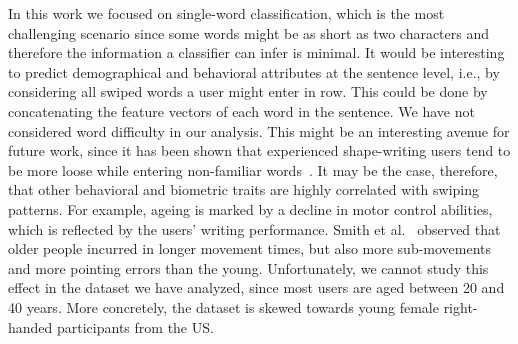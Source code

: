 \documentclass[11pt,oneside,a4paper,openright]{book}
\begin{document}




In this work we focused on single-word classification,
which is the most challenging scenario since some words might be as short as two characters
and therefore the information a classifier can infer is minimal.
It would be interesting to predict demographical and behavioral attributes
at the sentence level, i.e., by considering all swiped words a user might enter in row.
This could be done by concatenating the feature vectors of each word in the sentence.
We have not considered word difficulty in our analysis.
This might be an interesting avenue for future work,
since it has been shown that experienced shape-writing users
tend to be more loose while entering non-familiar words~\cite{Leiva21_swipe}.
It may be the case, therefore, that other behavioral and biometric traits
are highly correlated with swiping patterns.
For example, ageing is marked by a decline in motor control abilities, which is reflected by the users' writing performance.
Smith et al.~\cite{Smith1999} observed that older people incurred in longer movement times,
but also more sub-movements and more pointing errors than the young.
Unfortunately, we cannot study this effect in the dataset we have analyzed,
since most users are aged between 20 and 40 years.
More concretely, the dataset is skewed towards young female right-handed participants from the US.\\
\end{document}
